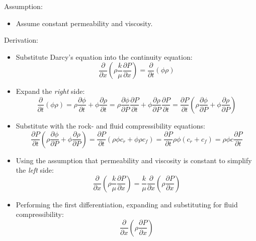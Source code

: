 \noindent Assumption:
\begin{itemize}
  \item Assume constant permeability and viscosity.
\end{itemize}

\noindent Derivation:
\begin{itemize}
  \item Substitute Darcy's equation into the continuity equation:
    \begin{equation}
      \frac{\partial}{\partial x} \left(\rho \frac{k}{\mu} \frac{\partial P}{\partial x}\right)
      = \frac{\partial}{\partial t} (\phi \rho)
    \end{equation}
  \item Expand the \emph{right} side:
    \begin{equation}
      \frac{\partial}{\partial t} (\phi \rho)
      = \rho \frac{\partial \phi}{\partial t} + \phi \frac{\partial \rho}{\partial t}
      = \rho \frac{\partial \phi}{\partial P} \frac{\partial P}{\partial t}
      + \phi \frac{\partial \rho}{\partial P} \frac{\partial P}{\partial t}
      = \frac{\partial P}{\partial t} \left( \rho \frac{\partial \phi}{\partial P} + \phi \frac{\partial \rho}{\partial P} \right)
    \end{equation}
  \item Substitute with the rock- and fluid compressibility equations:
    \begin{equation}
      \frac{\partial P}{\partial t} \left( \rho \frac{\partial \phi}{\partial P} + \phi \frac{\partial \rho}{\partial P} \right)
       = \frac{\partial P}{\partial t} \left( \rho \phi c_r + \phi \rho c_f \right)
       = \frac{\partial P}{\partial t} \rho \phi \left( c_r +  c_f \right)
       = \rho \phi c \frac{\partial P}{\partial t}
    \end{equation}
  \item Using the assumption that permeability and viscosity is constant to simplify the \emph{left} side:
    \begin{equation}
      \frac{\partial}{\partial x} \left(\rho \frac{k}{\mu} \frac{\partial P}{\partial x}\right)
      = \frac{k}{\mu} \frac{\partial}{\partial x} \left(\rho \frac{\partial P}{\partial x}\right)
    \end{equation}
  \item Performing the first differentiation, expanding and substituting for fluid compressibility:
    \begin{equation}
      \frac{\partial}{\partial x}\left(\rho\frac{\partial P}{\partial x}\right)

\end{equation}
\end{itemize}
